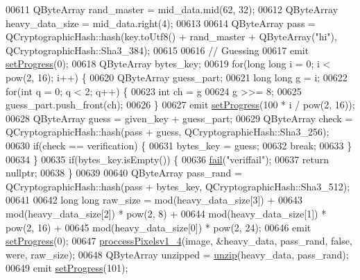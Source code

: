 \begin{DoxyCode}
00611     QByteArray rand\_master = mid\_data.mid(62, 32);
00612     QByteArray heavy\_data\_size = mid\_data.right(4);
00613 
00614     QByteArray pass = QCryptographicHash::hash(key.toUtf8() + rand\_master + QByteArray(\textcolor{stringliteral}{"hi"}), 
      QCryptographicHash::Sha3\_384);
00615 
00616     \textcolor{comment}{// Guessing}
00617     emit \hyperlink{class_model_p_c_afdcd80f0ed5062e145a71f09b0897547}{setProgress}(0);
00618     QByteArray bytes\_key;
00619     \textcolor{keywordflow}{for}(\textcolor{keywordtype}{long} \textcolor{keywordtype}{long} i = 0; i < pow(2, 16); i++) \{
00620         QByteArray guess\_part;
00621         \textcolor{keywordtype}{long} \textcolor{keywordtype}{long} g = i;
00622         \textcolor{keywordflow}{for}(\textcolor{keywordtype}{int} q = 0; q < 2; q++) \{
00623                 \textcolor{keywordtype}{int} ch = g %
00624                 g >>= 8;
00625                 guess\_part.push\_front(ch);
00626             \}
00627         emit \hyperlink{class_model_p_c_afdcd80f0ed5062e145a71f09b0897547}{setProgress}(100 * i / pow(2, 16));
00628         QByteArray guess = given\_key + guess\_part;
00629         QByteArray check = QCryptographicHash::hash(pass + guess, QCryptographicHash::Sha3\_256);
00630         \textcolor{keywordflow}{if}(check == verification) \{
00631             bytes\_key = guess;
00632             \textcolor{keywordflow}{break};
00633         \}
00634     \}
00635     \textcolor{keywordflow}{if}(bytes\_key.isEmpty()) \{
00636         \hyperlink{class_model_p_c_a47464b59b7e37fcee25e55475708aabd}{fail}(\textcolor{stringliteral}{"veriffail"});
00637         \textcolor{keywordflow}{return} \textcolor{keyword}{nullptr};
00638     \}
00639 
00640     QByteArray pass\_rand = QCryptographicHash::hash(pass + bytes\_key, QCryptographicHash::Sha3\_512);
00641 
00642     \textcolor{keywordtype}{long} \textcolor{keywordtype}{long} raw\_size = mod(heavy\_data\_size[3]) +
00643             mod(heavy\_data\_size[2]) * pow(2, 8) +
00644             mod(heavy\_data\_size[1]) * pow(2, 16) +
00645             mod(heavy\_data\_size[0]) * pow(2, 24);
00646     emit \hyperlink{class_model_p_c_afdcd80f0ed5062e145a71f09b0897547}{setProgress}(0);
00647     \hyperlink{class_model_p_c_a5cdb4d1d61ff62ee9d45b496a7dbf1fb}{proccessPixelsv1\_4}(image, &heavy\_data, pass\_rand, \textcolor{keyword}{false}, were, raw\_size);
00648     QByteArray unzipped = \hyperlink{class_model_p_c_a6da88f166785a49f73b22c169f956fd0}{unzip}(heavy\_data, pass\_rand);
00649     emit \hyperlink{class_model_p_c_afdcd80f0ed5062e145a71f09b0897547}{setProgress}(101);

\end{DoxyCode}
